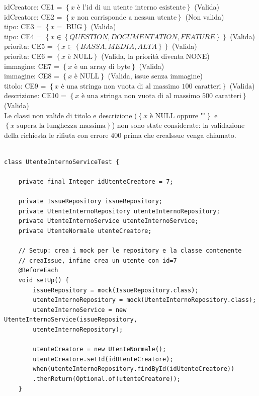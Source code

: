 \noindent idCreatore: CE1 = $\left\{ x \text{ è l'id di un utente interno esistente} \right\}$ (Valida) \\
idCreatore: CE2 = $\left\{ x \text{ non corrisponde a nessun utente} \right\}$  (Non valida) \\
tipo: CE3 = $\left\{ x = \text{ BUG} \right\}$ (Valida) \\
tipo: CE4 = $\left\{ x \in \left\{ QUESTION, DOCUMENTATION, FEATURE \right\} \right\}$ (Valida) \\
priorita: CE5 =  $\left\{ x \in \left\{ BASSA, MEDIA, ALTA \right\} \right\}$ (Valida) \\
priorita: CE6 = $\left\{ x \text{ è NULL} \right\}$ (Valida, la priorità diventa NONE) \\
immagine: CE7 =  $\left\{ x \text{ è un array di byte} \right\}$ (Valida) \\
immagine: CE8 = $\left\{ x \text{ è NULL} \right\}$ (Valida, issue senza immagine) \\
titolo: CE9 = $\left\{ x \text{ è una stringa non vuota di al massimo 100 caratteri} \right\}$ (Valida) \\
descrizione: CE10 = $\left\{ x \text{ è una stringa non vuota di al massimo 500 caratteri} \right\}$ (Valida) \\

\noindent Le classi non valide di titolo e descrizione ($\left\{ x \text{ è NULL oppure ""} \right\}$ e \\
$\left\{ x \text{ supera la lunghezza massima} \right\}$) non 
sono state considerate: la validazione della richiesta le rifiuta con errore 400 prima che creaIssue venga chiamato.  

\begin{listing}[!ht]
\begin{verbatim}

class UtenteInternoServiceTest {

    private final Integer idUtenteCreatore = 7;

    private IssueRepository issueRepository;
    private UtenteInternoRepository utenteInternoRepository;
    private UtenteInternoService utenteInternoService;
    private UtenteNormale utenteCreatore;

    // Setup: crea i mock per le repository e la classe contenente 
    // creaIssue, infine crea un utente con id=7
    @BeforeEach
    void setUp() {
        issueRepository = mock(IssueRepository.class);
        utenteInternoRepository = mock(UtenteInternoRepository.class);
        utenteInternoService = new UtenteInternoService(issueRepository, 
        utenteInternoRepository);

        utenteCreatore = new UtenteNormale();
        utenteCreatore.setId(idUtenteCreatore);
        when(utenteInternoRepository.findById(idUtenteCreatore))
        .thenReturn(Optional.of(utenteCreatore));
    }

\end{verbatim}
\end{listing}

